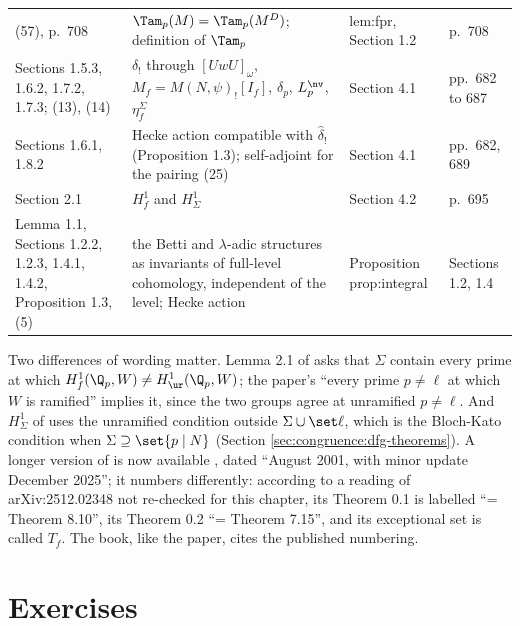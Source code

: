 \begin{remark}
\begin{center}
\begin{tabular}{p{}p{}p{}p{}}
(57), p.~708 & $\Tam_p(M)=\Tam_p(M^D)$; definition of $\Tam_p$ & lem:fpr, Section 1.2 & p.~708\\
Sections 1.5.3, 1.6.2, 1.7.2, 1.7.3; (13), (14) & $\hat\delta_!$ through $[UwU]_\omega$, $M_f=M(N,\psi)_![I_f]$, $\delta_p$, $L^{\nv}_p$, $\eta^\Sigma_f$ & Section 4.1 & pp.~682 to 687\\
Sections 1.6.1, 1.8.2 & Hecke action compatible with $\hat\delta_!$ (Proposition 1.3); self-adjoint for the pairing (25) & Section 4.1 & pp.~682, 689\\
Section 2.1 & $H^1_f$ and $H^1_\Sigma$ & Section 4.2 & p.~695\\
Lemma 1.1, Sections 1.2.2, 1.2.3, 1.4.1, 1.4.2, Proposition 1.3, (5) & the Betti and $\lambda$-adic structures as invariants of full-level cohomology, independent of the level; Hecke action & Proposition prop:integral & Sections 1.2, 1.4\\
\bottomrule
\end{tabular}
\end{center}
Two differences of wording matter. Lemma 2.1 of \cite{DFG04} asks that $\Sigma$ contain every prime at which $H^1_f(\Q_p,W)\ne H^1_{\ur}(\Q_p,W)$; the paper's ``every prime $p\ne\ell$ at which $W$ is ramified''
implies it, since the two groups agree at unramified $p\ne\ell$. And $H^1_\Sigma$ of \cite{DFG04} uses the unramified condition outside $\Sigma\cup\set\ell$, which is the Bloch-Kato condition when
$\Sigma\supseteq\set{p\mid N}$ (Section \ref{sec:congruence:dfg-theorems}). A longer version of \cite{DFG04} is now available \cite{DFG04long}, dated ``August 2001, with minor update December 2025''; it
numbers differently: according to a reading of arXiv:2512.02348 not re-checked for this chapter, its Theorem 0.1 is labelled ``= Theorem 8.10'', its Theorem 0.2 ``= Theorem 7.15'', and its
exceptional set is called $T_f$. The book, like the paper, cites the published numbering.
\end{remark}

\section{Exercises}\label{sec:congruence:exercises}

